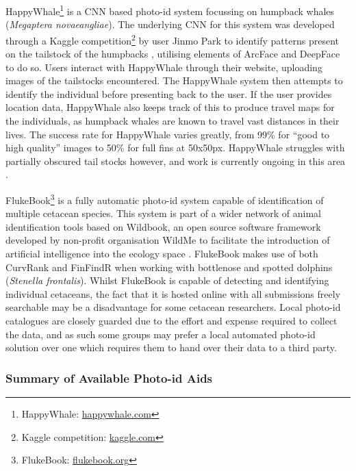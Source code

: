 HappyWhale\footnote{\label{footnote:happyWhale}HappyWhale: \href{https://happywhale.com/}{happywhale.com}} is a CNN based photo-id system focussing on humpback whales (\textit{Megaptera novaeangliae}). The underlying CNN for this system was developed through a Kaggle competition\footnote{Kaggle competition: \href{https://www.kaggle.com/c/whale-categorization-playground}{kaggle.com}} by user Jinmo Park to identify patterns present on the tailstock of the humpbacks \cite{kaggle_humpback_2018}, utilising elements of ArcFace \cite{deng_arcface_2019} and DeepFace \cite{taigman_deepface_2014} to do so. Users interact with HappyWhale through their website, uploading images of the tailstocks encountered. The HappyWhale system then attempts to identify the individual before presenting back to the user. If the user provides location data, HappyWhale also keeps track of this to produce travel maps for the individuals, as humpback whales are known to travel vast distances in their lives. The success rate for HappyWhale varies greatly, from 99\% for ``good to high quality'' images to 50\% for full fins at 50x50px. HappyWhale struggles with partially obscured tail stocks however, and work is currently ongoing in this area \cite{cheeseman_happywhale_2019}. 

FlukeBook\footnote{\label{footnote:flukeBook}FlukeBook: \href{https://www.flukebook.org/}{flukebook.org}} is a fully automatic photo-id system capable of identification of multiple cetacean species. This system is part of a wider network of animal identification tools based on Wildbook, an open source software framework developed by non-profit organisation WildMe to facilitate the introduction of artificial intelligence into the ecology space \cite{berger-wolf_wildbook:_2017}. FlukeBook makes use of both CurvRank and FinFindR when working with bottlenose and spotted dolphins (\textit{Stenella frontalis}). Whilst FlukeBook is capable of detecting and identifying individual cetaceans, the fact that it is hosted online with all submissions freely searchable may be a disadvantage for some cetacean researchers. Local photo-id catalogues are closely guarded due to the effort and expense required to collect the data, and as such some groups may prefer a local automated photo-id solution over one which requires them to hand over their data to a third party. 

\subsubsection{Summary of Available Photo-id Aids}\label{ch:Background,sec:conTech,sub:photoIDAides,subsub:Summary}

